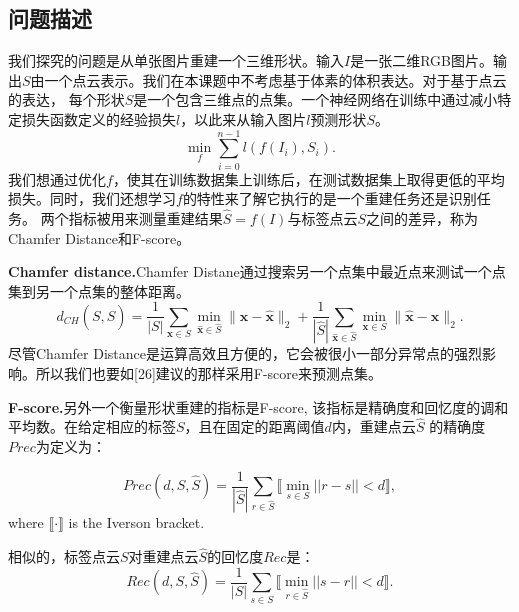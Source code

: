 \documentclass[bachelor, nocolorlinks, printoneside]{seuthesis} %
\begin{document}
\begin{Main}
\section{问题描述}
我们探究的问题是从单张图片重建一个三维形状。输入$I$是一张二维RGB图片。输出$S$由一个点云表示。我们在本课题中不考虑基于体素的体积表达。对于基于点云的表达，
每个形状$S$是一个包含三维点的点集。一个神经网络在训练中通过减小特定损失函数定义的经验损失$l$，以此来从输入图片$l$预测形状$S$。
\begin{equation}
    \min_f \sum_{i=0}^{n-1} {l(f(I_i), S_i)}.
\end{equation}
我们想通过优化$f$，使其在训练数据集上训练后，在测试数据集上取得更低的平均损失。同时，我们还想学习$f$的特性来了解它执行的是一个重建任务还是识别任务。
两个指标被用来测量重建结果$\widehat{S} = f(I)$与标签点云$S$之间的差异，称为Chamfer Distance和F-score。

\noindent
\textbf{Chamfer distance.}\label{sec:chamfer}Chamfer Distane通过搜索另一个点集中最近点来测试一个点集到另一个点集的整体距离。
\begin{equation}\label{eqn:chamfer}
	d_{CH}(S,\widehat{S}) = \frac{1}{|S|}\sum\limits_{\mathbf{x}\in S}\min_{\widehat{\mathbf{x}}\in \widehat{S}}\|\mathbf{x}-\widehat{\mathbf{x}}\|_2 + 
    \frac{1}{|\widehat{S}|}\sum\limits_{\widehat{\mathbf{x}}\in \widehat{S}}\min_{\mathbf{x}\in S}\|\widehat{\mathbf{x}} - \mathbf{x}\|_2.
\end{equation}
尽管Chamfer Distance是运算高效且方便的，它会被很小一部分异常点的强烈影响。所以我们也要如[26]建议的那样采用F-score来预测点集。

\noindent
\textbf{F-score.}\label{sec:fscore}另外一个衡量形状重建的指标是F-score, 该指标是精确度和回忆度的调和平均数。在给定相应的标签$S$，且在固定的距离阈值$d$内，重建点云$\widehat{S}$
的精确度$\textit{Prec}$为定义为：

\begin{equation} \label{eq:precision}
\textit{Prec}(\textit{d}, S, \widehat{S}) = \frac{1}{|\widehat{S}|} \sum_{r \in \widehat{S}} \llbracket \min_{s \in S} ||r-s || < \textit{d} \rrbracket,
\end{equation}
where $\llbracket \cdot \rrbracket$ is the Iverson bracket.
    
相似的，标签点云$S$对重建点云$\widehat{S}$的回忆度$\textit{Rec}$是：
\begin{equation} \label{eq:recall}
    \textit{Rec}(\textit{d}, S, \widehat{S}) = \frac{1}{|S|} \sum_{s \in S} \llbracket \min_{r \in \widehat{S}} ||s-r || < \textit{d} \rrbracket.
    \end{equation}


\end{Main}
\end{document}
